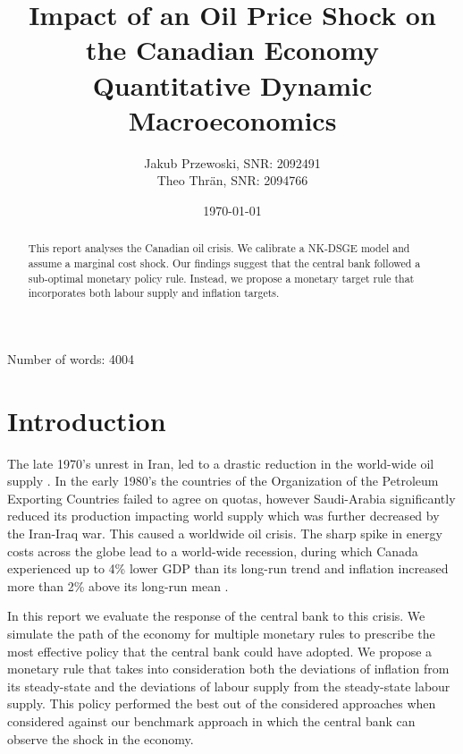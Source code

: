 \documentclass[12pt]{article}
\title{\textbf{Impact of an Oil Price Shock on the Canadian Economy} \\ \large{Quantitative Dynamic Macroeconomics}}
\author{Jakub Przewoski, SNR: 2092491\\ Theo Thrän, SNR: 2094766}
\date{\today}
\begin{document}
\maketitle
{}

\begin{center}
    \large
    Number of words: 4004
    
    \vfill{}
    \begin{abstract}
        This report analyses the Canadian oil crisis. We calibrate a NK-DSGE model and assume a marginal cost shock. Our findings suggest that the central bank followed a sub-optimal monetary policy rule. Instead, we propose a monetary target rule that incorporates both labour supply and inflation targets. 
    \end{abstract}
\end{center}

\newpage

\tableofcontents{}

\newpage

\section{Introduction}
The late 1970's unrest in Iran, led to a drastic reduction in the world-wide oil supply \parencite{OilSqueeze1979}. In the early 1980's the countries of the Organization of the Petroleum Exporting Countries failed to agree on quotas, however Saudi-Arabia significantly reduced its production impacting world supply \parencite{tagliabueOPECFAILSSET1982} which was further decreased by the Iran-Iraq war. This caused a worldwide oil crisis. The sharp spike in energy costs across the globe lead to a world-wide recession, during which Canada experienced up to 4\% lower GDP than its long-run trend and inflation increased more than 2\% above its long-run mean 
\parencite{koseGlobalRecessions2020,worldbank_inflation_ca,fred_gdp_per_capita_ca}.

In this report we evaluate the response of the central bank to this crisis. We simulate the path of the economy for multiple monetary rules to prescribe the most effective policy that the central bank could have adopted. We propose a monetary rule that takes into consideration both the deviations of inflation from its steady-state and the deviations of labour supply from the steady-state labour supply. This policy performed the best out of the considered approaches when considered against our benchmark approach in which the central bank can observe the shock in the economy.
\end{document}
